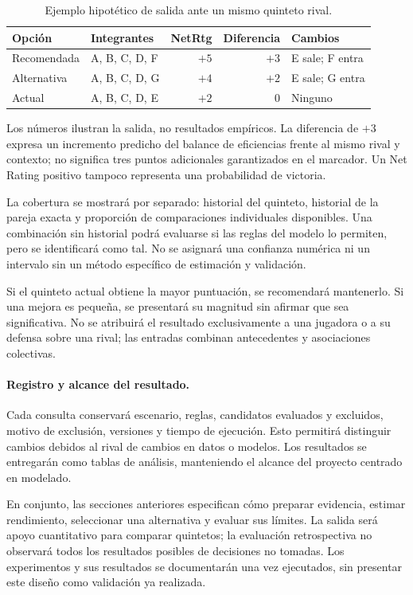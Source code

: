 \begin{table}[htbp]
\centering\small
\caption{Ejemplo hipotético de salida ante un mismo quinteto rival.}
\label{tab:ejemplo-recomendacion-final}
\begin{tabularx}{\textwidth}{@{}lXrrl@{}}
\toprule
\textbf{Opción}&\textbf{Integrantes}&\textbf{NetRtg}&\textbf{Diferencia}&\textbf{Cambios}\\\midrule
Recomendada & A, B, C, D, F & $+5$ & $+3$ & E sale; F entra\\
Alternativa & A, B, C, D, G & $+4$ & $+2$ & E sale; G entra\\
Actual & A, B, C, D, E & $+2$ & $0$ & Ninguno\\
\bottomrule
\end{tabularx}
\end{table}

Los números ilustran la salida, no resultados empíricos. La diferencia de $+3$ expresa un incremento predicho del balance de eficiencias frente al mismo rival y contexto; no significa tres puntos adicionales garantizados en el marcador. Un Net Rating positivo tampoco representa una probabilidad de victoria.

La cobertura se mostrará por separado: historial del quinteto, historial de la pareja exacta y proporción de comparaciones individuales disponibles. Una combinación sin historial podrá evaluarse si las reglas del modelo lo permiten, pero se identificará como tal. No se asignará una confianza numérica ni un intervalo sin un método específico de estimación y validación.

Si el quinteto actual obtiene la mayor puntuación, se recomendará mantenerlo. Si una mejora es pequeña, se presentará su magnitud sin afirmar que sea significativa. No se atribuirá el resultado exclusivamente a una jugadora o a su defensa sobre una rival; las entradas combinan antecedentes y asociaciones colectivas.

\paragraph*{Registro y alcance del resultado.}
Cada consulta conservará escenario, reglas, candidatos evaluados y excluidos, motivo de exclusión, versiones y tiempo de ejecución. Esto permitirá distinguir cambios debidos al rival de cambios en datos o modelos. Los resultados se entregarán como tablas de análisis, manteniendo el alcance del proyecto centrado en modelado.

En conjunto, las secciones anteriores especifican cómo preparar evidencia, estimar rendimiento, seleccionar una alternativa y evaluar sus límites. La salida será apoyo cuantitativo para comparar quintetos; la evaluación retrospectiva no observará todos los resultados posibles de decisiones no tomadas. Los experimentos y sus resultados se documentarán una vez ejecutados, sin presentar este diseño como validación ya realizada.

\endgroup
